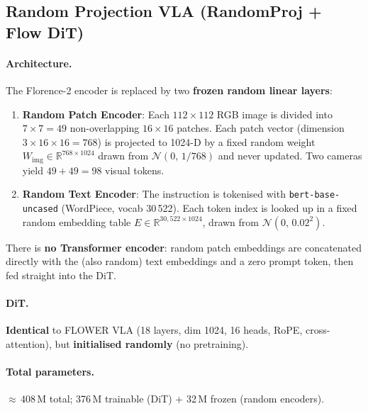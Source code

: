 \documentclass[11pt,a4paper]{article}
\begin{document}
\subsection{Random Projection VLA (RandomProj + Flow DiT)}
\label{sec:method_randproj}

\paragraph{Architecture.}
The Florence-2 encoder is replaced by two \textbf{frozen random linear layers}:
\begin{enumerate}
  \item \textbf{Random Patch Encoder}:
        Each $112{\times}112$ RGB image is divided into $7{\times}7 = 49$
        non-overlapping $16{\times}16$ patches.
        Each patch vector (dimension $3\!\times\!16\!\times\!16 = 768$) is
        projected to 1024-D by a fixed random weight
        $W_{\text{img}} \!\in\! \mathbb{R}^{768\times1024}$
        drawn from $\mathcal{N}(0,\,1/768)$ and never updated.
        Two cameras yield $49 + 49 = 98$ visual tokens.
  \item \textbf{Random Text Encoder}:
        The instruction is tokenised with
        \texttt{bert-base-uncased} (WordPiece, vocab 30\,522).
        Each token index is looked up in a fixed random embedding table
        $E \!\in\! \mathbb{R}^{30{,}522\times1024}$,
        drawn from $\mathcal{N}(0,\,0.02^2)$.
\end{enumerate}
There is \textbf{no Transformer encoder}: random patch embeddings are
concatenated directly with the (also random) text embeddings and a zero prompt
token, then fed straight into the DiT.

\paragraph{DiT.}
\textbf{Identical} to FLOWER VLA (18 layers, dim 1024, 16 heads, RoPE, cross-attention),
but \textbf{initialised randomly} (no pretraining).

\paragraph{Total parameters.}
$\approx$\,408\,M total; 376\,M trainable (DiT) + 32\,M frozen (random encoders).

\end{document}
